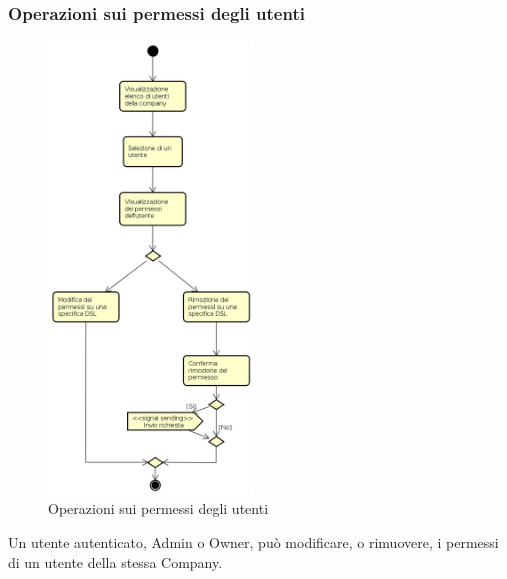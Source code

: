 \subsubsection{Operazioni sui permessi degli utenti}
\begin{figure}[H]
\begin{center}
\includegraphics[height=12cm]{res/sections/backend/activities/operazioniSuUtenti.png}
\caption{Operazioni sui permessi degli utenti}
\end{center}
\end{figure}
Un utente autenticato, Admin o Owner, può modificare, o rimuovere, i permessi di un utente della stessa Company.
